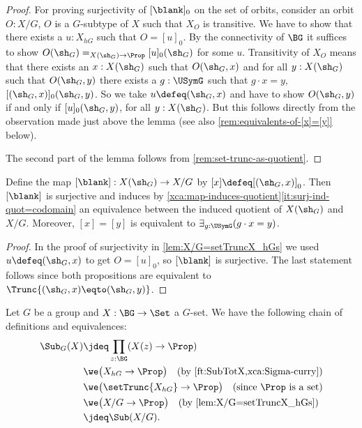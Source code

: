 
\begin{proof}
  For proving surjectivity of $[\blank]_0$ on the set of orbits, 
  consider an orbit $O:X/G$, \ie
  $O$ is a $G$-subtype of $X$ such that $X_O$ is transitive. 
  We have to show that there exists a $u:X_{hG}$ such that $O=[u]_0$.
  By the connectivity of $\BG$ it suffices to show 
  $O(\sh_G)=_{X(\sh_G)\to\Prop}[u]_0(\sh_G)$ for some $u$.
  Transitivity of $X_O$ means that there exists an $x:X(\sh_G)$
  such that $O(\sh_G,x)$ and for all $y:X(\sh_G)$ such that
  $O(\sh_G,y)$ there
  exists a $g:\USymG$ such that $g\cdot x = y$, \ie $[(\sh_G,x)]_0(\sh_G,y)$.
  So we take $u\defeq(\sh_G,x)$ and have to show $O(\sh_G,y)$ if and only if
  $[u]_0(\sh_G,y)$, for all $y:X(\sh_G)$. But this follows directly from
  the observation made just above the lemma
  (see also \cref{rem:equivalents-of-[x]=[y]} below).
  
  The second part of the lemma follows from \cref{rem:set-trunc-as-quotient}. 
\end{proof}

\begin{corollary}\label{cor:orbit-equiv}
Define the map $[\blank] : X(\sh_G) \to X/G$ by $[x]\defeq[(\sh_G,x)]_0$.
Then $[\blank]$ is surjective and induces
by \cref{xca:map-induces-quotient}\ref{it:surj-ind-quot=codomain}
an equivalence between the induced quotient of $X(\sh_G)$ and $X/G$.
Moreover, $[x] = [y]$ is equivalent to $\exists_{g:\USymG}(g\cdot x = y)$.
\end{corollary}
\begin{proof}
In the proof of surjectivity in \cref{lem:X/G=setTruncX_hGs} we used
$u\defeq(\sh_G,x)$ to get $O=[u]_0$, so $[\blank]$ is surjective. 
The last statement follows since
both propositions are equivalent to $\Trunc{(\sh_G,x)\eqto(\sh_G,y)}$.
\end{proof}

\begin{remark}\label{rem:SubGX=Sub(X/G)}
Let $G$ be a group and $X : \BG\to\Set$ a $G$-set.
We have the following chain of definitions and equivalences:
\begin{align*}
\Sub_G(X)&\jdeq \prod_{z:\BG}(X(z)\to\Prop) 
\\
         & \we \bigl(X_{hG}\to\Prop\bigr)
               \quad\text{(by \cref{ft:SubTotX,xca:Sigma-curry})}
\\
         & \we \bigl(\setTrunc{X_{hG}}\to\Prop\bigr) 
               \quad\text{(since $\Prop$ is a set)}
\\        
         & \we \bigl(X/G\to\Prop\bigr)
               \quad\text{(by \cref{lem:X/G=setTruncX_hGs})}
\\
         & \jdeq \Sub(X/G).\qedhere
\end{align*}
\end{remark}

